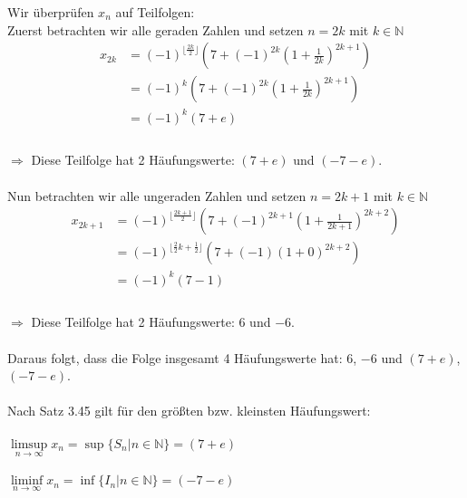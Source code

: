 \begin{lsg}
Wir \"uberpr\"ufen $x_n$ auf Teilfolgen:\\
Zuerst betrachten wir alle geraden Zahlen und setzen $n=2k$ mit $k\in \mathbb{N}$\\

\begin{equation}
\begin{aligned}
    x_{2k} &= (-1)^{\lfloor \frac{2k}{2}\rfloor} \left(7+(-1)^{2k}\left(1+\frac{1}{2k}\right)^{2k+1} \right)\\
    &= (-1)^k \left(7+(-1)^{2k}\left(1+\frac{1}{2k}\right)^{2k+1} \right)\\
    &= (-1)^k \left(7+e \right)\\
\end{aligned}
\end{equation}
\\
$\Rightarrow$ Diese Teilfolge hat 2 H\"aufungswerte: $(7+e)$ und $(-7-e)$.\\
\\
Nun betrachten wir alle ungeraden Zahlen und setzen $n=2k+1$ mit $k\in \mathbb{N}$\\
\begin{equation}
\begin{aligned}
    x_{2k+1} &= (-1)^{\lfloor \frac{2k+1}{2}\rfloor} \left(7+(-1)^{2k+1}\left(1+\frac{1}{2k+1}\right)^{2k+2} \right)\\
    &= (-1)^{\lfloor \frac{2}{2}k+\frac{1}{2}\rfloor} \left(7+(-1)\left(1+0\right)^{2k+2} \right)\\
    &= (-1)^k \left(7-1 \right)\\
\end{aligned}
\end{equation}
\\
$\Rightarrow$ Diese Teilfolge hat 2 H\"aufungswerte: $6$ und $-6$.\\
\\
Daraus folgt, dass die Folge insgesamt 4 H\"aufungswerte hat: $6$, $-6$ und $(7+e)$, $(-7-e)$.\\
\\
Nach Satz 3.45 gilt für den gr\"o{\ss}ten bzw. kleinsten H\"aufungswert:\\
\\
$\limsup\limits_{n \to \infty} x_n = \sup\{S_n|n\in\mathbb{N}\}=(7+e)$\\
\\
$\liminf\limits_{n \to \infty} x_n = \inf\{I_n|n\in\mathbb{N}\}=(-7-e)$
\end{lsg}

